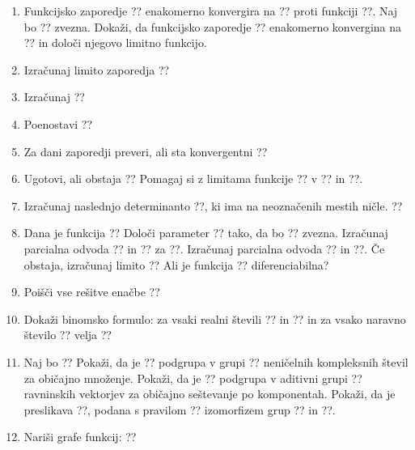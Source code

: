 \documentclass[a4paper,12pt]{article}
\begin{document}
\begin{enumerate}
\item
Funkcijsko zaporedje ?? enakomerno konvergira na ?? proti funkciji ??.
Naj bo ?? zvezna. Dokaži, da funkcijsko zaporedje ??
enakomerno konvergina na ?? in določi njegovo limitno funkcijo.

\item
Izračunaj limito zaporedja
??

\item
Izračunaj
??

\item
Poenostavi
??

\item
Za dani zaporedji preveri, ali sta konvergentni
??

\item
Ugotovi, ali obstaja
??
Pomagaj si z limitama funkcije ?? v ?? in ??.

\item
Izračunaj naslednjo determinanto ??, ki ima na neoznačenih mestih ničle.
??

\item
Dana je funkcija
??
Določi parameter ?? tako, da bo ?? zvezna.
Izračunaj parcialna odvoda ?? in ?? za ??.
Izračunaj parcialna odvoda ?? in ??.
Če obstaja, izračunaj limito
??
Ali je funkcija ?? diferenciabilna?

\item
Poišči vse rešitve enačbe
??

\item
Dokaži binomsko formulo: za vsaki realni števili ?? in ?? in za vsako naravno število ?? velja
??

\item
Naj bo
??
Pokaži, da je ?? podgrupa v grupi ??
neničelnih kompleksnih števil za običajno množenje.
Pokaži, da je ?? podgrupa v aditivni grupi ??
ravninskih vektorjev za običajno seštevanje po komponentah.
Pokaži, da je preslikava ??, podana s pravilom
??
izomorfizem grup ?? in ??.

\item
Nariši grafe funkcij:
??
\end{enumerate}
\end{document}
